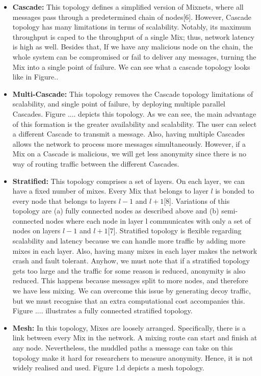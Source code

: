 \documentclass[logo,msc,cyber]{infthesis}   %
\begin{document}
\begin{itemize}
   \item \textbf{Cascade:} This topology defines a simplified version of
   Mixnets, where all messages pass through a predetermined chain of nodes[6].
   However, Cascade topology has many limitations in terms of scalability.
   Notably, its maximum throughput is caped to the throughput of a single Mix;
   thus, network latency is high as well. Besides that, If we have any malicious
   node on the chain, the whole system can be compromised or fail to deliver any
   messages, turning the Mix into a single point of failure. We can see what a
   cascade topology looks like in Figure..
   \item \textbf{Multi-Cascade:} This topology removes the Cascade topology
   limitations of scalability, and single point of failure, by deploying
   multiple parallel Cascades. Figure .... depicts this topology. As we can see,
   the main advantage of this formation is the greater availability and
   scalability. The user can select a different Cascade to transmit a message.
   Also, having multiple Cascades allows the network to process more messages
   simultaneously. However, if a Mix on a Cascade is malicious, we will get
   less anonymity since there is no way of routing traffic between the different
   Cascades.
   \item \textbf{Stratified:} This topology comprises a set of layers. On each
   layer, we can have a fixed number of mixes. Every Mix that belongs to layer $l$
   is bonded to every node that belongs to layers $l-1$ and $l+1$[8]. Variations of
   this topology are (a) fully connected nodes as described above and (b)
   semi-connected nodes where each node in layer l communicates with only a set
   of nodes on layers $l-1$ and $l+1$[7]. Stratified topology is flexible
   regarding scalability and latency because we can handle more traffic by
   adding more mixes in each layer. Also, having many mixes in each layer makes
   the network crash and fault tolerant. Anyhow, we must note that if a
   stratified topology gets too large and the traffic for some reason is
   reduced, anonymity is also reduced. This happens because messages split to
   more nodes, and therefore we have less mixing. We can overcome this issue by
   generating decoy traffic, but we must recognise that an extra computational
   cost accompanies this. Figure .... illustrates a fully connected stratified
   topology.
   \item \textbf{Mesh:} In this topology, Mixes are loosely arranged.
   Specifically, there is a link between every Mix in the network. A mixing
   route can start and finish at any node. Nevertheless, the muddled paths
   a message can take on this topology make it hard for researchers to measure
   anonymity. Hence, it is not widely realised and used. Figure 1.d depicts a
   mesh topology.
\end{itemize}
\end{document}

